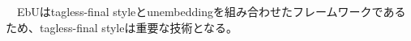 \documentclass[uplatex]{sumiilab-paper}
\theoremstyle{mystyle}
\numberwithin{definition}{chapter} %
\begin{document}
　EbUはtagless-final styleとunembedding\cite{syntaxforfree_atkey,unembedding_atkey}を組み合わせたフレームワークであるため、tagless-final styleは重要な技術となる。




\end{document}
